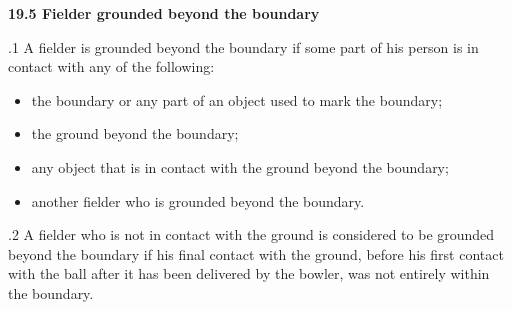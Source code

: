 \documentclass[12pt]{article}
\begin{document}
\vspace{\baselineskip}
{\fontsize{11pt}{13.2pt}\selectfont \textbf{19.5 \tabto{0.47in} Fielder grounded beyond the boundary}\par}\par


\vspace{\baselineskip}
{\fontsize{9pt}{10.8pt}.1 \tabto{0.49in} A fielder is grounded beyond the boundary if some part of his person is in contact with any of the following:\par}\par


\vspace{\baselineskip}
\begin{itemize}
	\item {\fontsize{9pt}{10.8pt}\selectfont the boundary or any part of an object used to mark the boundary;\par}\par


\vspace{\baselineskip}
	\item {\fontsize{9pt}{10.8pt}\selectfont the ground beyond the boundary;\par}\par


\vspace{\baselineskip}
	\item {\fontsize{9pt}{10.8pt}\selectfont any object that is in contact with the ground beyond the boundary;\par}\par


\vspace{\baselineskip}
	\item {\fontsize{9pt}{10.8pt}\selectfont another fielder who is grounded beyond the boundary.\par}
\end{itemize}\par


\vspace{\baselineskip}
\begin{adjustwidth}{0.5in}{0.07in}
{\fontsize{9pt}{10.8pt}.2 \tabto{0.49in} A fielder who is not in contact with the ground is considered to be grounded beyond the boundary if his final contact with the ground, before his first contact with the ball after it has been delivered by the bowler, was not entirely within the boundary.\par}\par

\end{adjustwidth}
\end{document}
